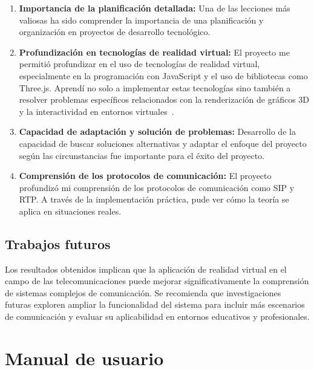 \documentclass[a4paper, 12pt]{book}
\begin{document}
\begin{enumerate}
\item \textbf{Importancia de la planificación detallada:} Una de las lecciones más valiosas ha sido comprender la importancia de una planificación 
y organización en proyectos de desarrollo tecnológico.

\item \textbf{Profundización en tecnologías de realidad virtual:} El proyecto me permitió profundizar en el uso de tecnologías de realidad virtual, 
especialmente en la programación con JavaScript y el uso de bibliotecas como Three.js. Aprendí no solo a implementar estas tecnologías sino también 
a resolver problemas específicos relacionados con la renderización de gráficos 3D y la interactividad en entornos virtuales~\cite{Ejemplos_Three.js}.

\item \textbf{Capacidad de adaptación y solución de problemas:} Desarrollo de la capacidad de buscar soluciones alternativas y adaptar el enfoque del proyecto según las 
circunstancias fue importante para el éxito del proyecto.

\item \textbf{Comprensión de los protocolos de comunicación:} El proyecto profundizó mi comprensión de los protocolos de comunicación como SIP y RTP. 
A través de la implementación práctica, pude ver cómo la teoría se aplica en situaciones reales.
\end{enumerate}


\section{Trabajos futuros}
\label{sec:trabajos_futuros}

Los resultados obtenidos implican que la aplicación de realidad virtual en el campo de las telecomunicaciones puede mejorar 
significativamente la comprensión de sistemas complejos de comunicación. Se recomienda que investigaciones futuras exploren 
ampliar la funcionalidad del sistema para incluir más escenarios de comunicación y evaluar su 
aplicabilidad en entornos educativos y profesionales.



\cleardoublepage
\appendix
\chapter{Manual de usuario}
\label{app:manual}
\end{document}
